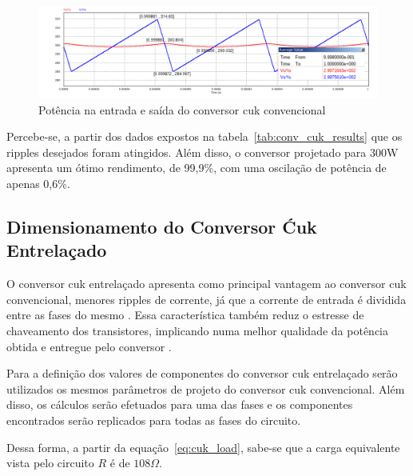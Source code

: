 \documentclass[
	12pt,				%
	openany,
	onseside,
	a4paper,			%
	english,			%
	french,				%
	spanish,			%
	brazil,				%
	]{abntex2}
\begin{document}
\begin{figure}[H]%
	\centering
		\includegraphics[width= \linewidth]{cuk_conv_power_sign}
		\caption{Potência na entrada e saída do conversor cuk convencional}
		\label{fig:cuk_conv_power_sign}
\end{figure}

Percebe-se, a partir dos dados expostos na tabela~\ref{tab:conv_cuk_results} que os ripples desejados foram atingidos. Além disso, o conversor projetado para 300W apresenta um ótimo rendimento, de 99,9\%, com uma oscilação de potência de apenas 0,6\%.


\subsection{Dimensionamento do Conversor Ćuk Entrelaçado}

O conversor cuk entrelaçado apresenta como principal vantagem ao conversor cuk convencional, menores ripples de corrente, já que a corrente de entrada é dividida entre as fases do mesmo \cite{JOSEPH_2015_Intervealed_CUK}\cite{JOSEPH_2017_Intervealed_CUK}. Essa característica também reduz o estresse de chaveamento dos transistores, implicando numa melhor qualidade da potência obtida e entregue pelo conversor \cite{JOSEPH_2017_Intervealed_CUK}.

Para a definição dos valores de componentes do conversor cuk entrelaçado serão utilizados os mesmos parâmetros de projeto do conversor cuk convencional. Além disso, os cálculos serão efetuados para uma das fases e os componentes encontrados serão replicados para todas as fases do circuito.

Dessa forma, a partir da equação~\ref{eq:cuk_load}, sabe-se que a carga equivalente vista pelo circuito $R$ é de $108\Omega$.
\end{document}
